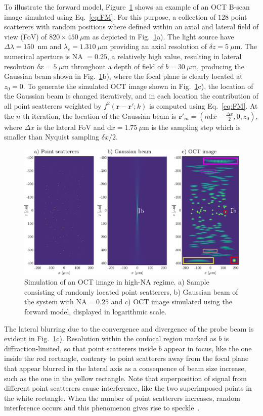 To illustrate the forward model, Figure~\ref{fig:FM1} shows an example of an OCT B-scan image simulated using Eq.~\ref{eq:FM}. For this purpose, a collection of $128$ point scatterers with random positions where defined within an axial and lateral field of view (FoV) of $820\times 450~\mu$m as depicted in Fig.~\ref{fig:FM1}a). The light source have $\Delta\lambda=150$~nm and $\lambda_c=1.310~\mu$m providing an axial resolution of $\delta z=5~\mu$m. The numerical aperture is NA $= 0.25$, a relatively high value, resulting in lateral resolution $\delta x=5~\mu$m throughout a depth of field of $b=30~\mu$m, producing the Gaussian beam shown in Fig.~\ref{fig:FM1}b), where the focal plane is clearly located at $z_0=0$. To generate the simulated OCT image shown in Fig.~\ref{fig:FM1}c), the location of the Gaussian beam is changed iteratively, and in each location the contribution of all point scatterers weighted by $f^2(\mathbf{r}-\mathbf{r'}; k)$ is computed using Eq.~\ref{eq:FM}. At the $n$-th iteration, the location of the Gaussian beam is $\mathbf{r}'_m=(n\text{d}x - \frac{\Delta x}{2},0,z_0)$, where $\Delta x$ is the lateral FoV and $\text{d}x = 1.75~\mu$m is the sampling step which is smaller than Nyquist sampling $\delta x / 2$.

\begin{figure}[htb!]
    \centering
    \includegraphics[width=\textwidth]{Figures/TheoreticalBasis/FM.pdf}
    \caption{Simulation of an OCT image in high-NA regime. a) Sample consisting of randomly located point scatterers, b) Gaussian beam of the system with NA$=0.25$ and c) OCT image simulated using the forward model, displayed in logarithmic scale.}
    \label{fig:FM1}
\end{figure}

The lateral blurring due to the convergence and divergence of the probe beam is evident in Fig.~\ref{fig:FM1}c). Resolution within the confocal region marked as $b$ is diffraction-limited, so that point scatterers inside $b$ appear in focus, like the one inside the red rectangle, contrary to point scatterers away from the focal plane that appear blurred in the lateral axis as a consequence of beam size increase, such as the one in the yellow rectangle. Note that superposition of signal from different point scatterers cause interference, like the two superimposed points in the white rectangle. When the number of point scatterers increases, random interference occurs and this phenomenon gives rise to speckle~\cite{}.

